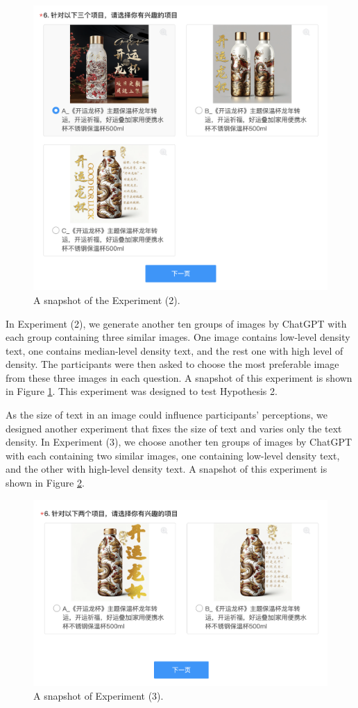 \documentclass[a4paper]{article}
\begin{document}
\begin{figure}[h!]
    \centering
    \includegraphics[width=0.8\linewidth]{experiment4.png}
    \caption{A snapshot of the Experiment (2).}
    \label{fig:Experiment4}
\end{figure}

In Experiment (2), we generate another ten groups of images by ChatGPT with each group containing three similar images. One image contains low-level density text, one contains median-level density text, and the rest one with high level of density. The participants were then asked to choose the most preferable image from these three images in each question. A snapshot of this experiment is shown in Figure \ref{fig:Experiment4}. This experiment was designed to test Hypothesis 2. 

As the size of text in an image could influence participants' perceptions, we designed another experiment that fixes the size of text and varies only the text density. In Experiment (3), we choose another ten groups of images by ChatGPT with each containing two similar images, one containing low-level density text, and the other with high-level density text. A snapshot of this experiment is shown in Figure \ref{fig:Experiment5}.

\begin{figure}[h!]
    \centering
    \includegraphics[width=0.8\linewidth]{experiment5.png}
    \caption{A snapshot of Experiment (3).}
    \label{fig:Experiment5}
\end{figure}
\end{document}
